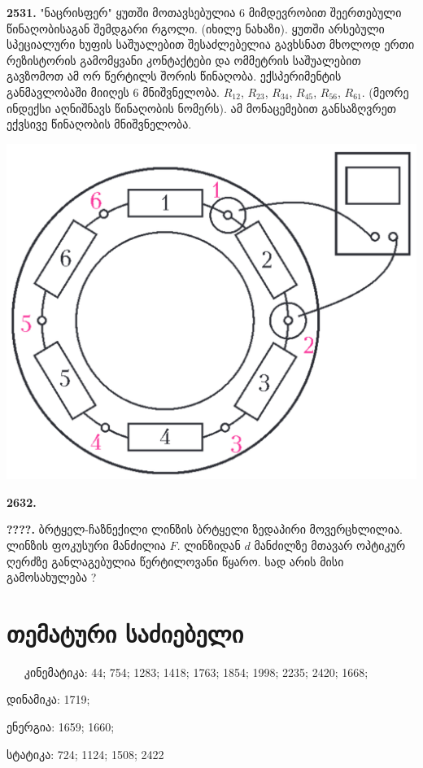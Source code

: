 \documentclass[12pt,a4paper,]{report}
\begin{document}
\textbf{2531.} "ნაცრისფერ" ყუთში მოთავსებულია 6 მიმდევრობით შეერთებული წინაღობისაგან შემდგარი რგოლი. (იხილე ნახაზი). ყუთში არსებული სპეციალური ხუფის საშუალებით შესაძლებელია გავხსნათ მხოლოდ ერთი რეზისტორის გამომყვანი კონტაქტები და ომმეტრის საშუალებით გავზომოთ ამ ორ წერტილს შორის წინაღობა. ექსპერიმენტის განმავლობაში მიიღეს 6 მნიშვნელობა. $R_{12}$, $R_{23}$, $R_{34}$, $R_{45}$, $R_{56}$, $R_{61}$. (მეორე ინდექსი აღნიშნავს წინაღობის ნომერს). ამ მონაცემებით განსაზღვრეთ ექვსივე წინაღობის მნიშვნელობა.
	\begin{center}
		\includegraphics[scale=0.3]{images/F2531.png}
	\end{center}

\textbf{2632.} 

\newpage

\textbf{????.} ბრტყელ-ჩაზნექილი ლინზის ბრტყელი ზედაპირი მოვერცხლილია. ლინზის ფოკუსური მანძილია $F$. ლინზიდან $d$ მანძილზე მთავარ ოპტიკურ ღერძზე განლაგებულია წერტილოვანი წყარო. სად არის მისი გამოსახულება ? 


\chapter{თემატური საძიებელი}

$\ \quad$ კინემატიკა: 44; 754; 1283; 1418; 1763; 1854; 1998; 2235; 2420; 1668;

დინამიკა: 1719; 

ენერგია: 1659; 1660;

სტატიკა: 724; 1124; 1508; 2422
\end{document}
